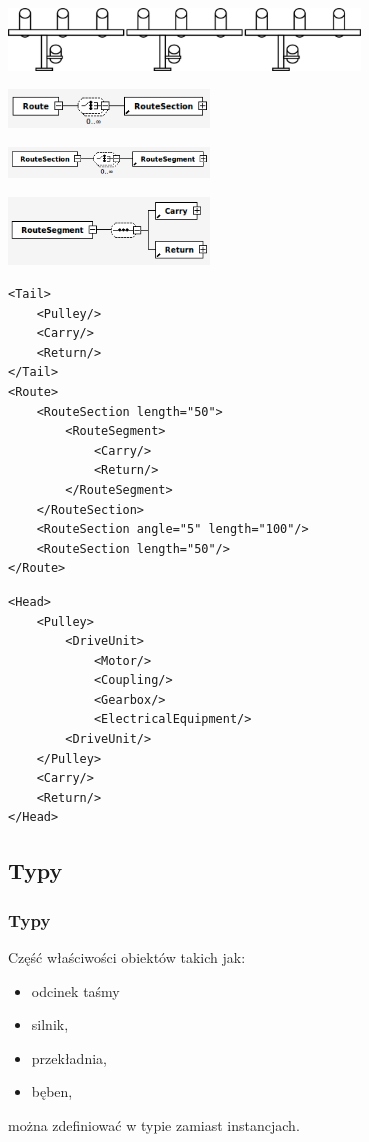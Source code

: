 \documentclass{beamer}
\begin{document}
\begin{frame}
\begin{center}
\includegraphics[width=0.7\textwidth]{png/odcinek_trasy}

\pause

\includegraphics[width=0.4\textwidth]{png/trasa_xsd}

\pause

\includegraphics[width=0.4\textwidth]{png/odcinek_trasy_xsd}

\pause

\includegraphics[width=0.4\textwidth]{png/segment_trasy_xsd}
\end{center}
\end{frame}

\begin{frame}[fragile]
\begin{verbatim}
<Tail>
    <Pulley/>
    <Carry/>
    <Return/>
</Tail>
<Route>
    <RouteSection length="50">
        <RouteSegment>
            <Carry/>
            <Return/>
        </RouteSegment>
    </RouteSection>
    <RouteSection angle="5" length="100"/>
    <RouteSection length="50"/>
</Route>
\end{verbatim}
\end{frame}

\begin{frame}[fragile]
\begin{verbatim}
<Head>
    <Pulley>
        <DriveUnit>
            <Motor/>
            <Coupling/>
            <Gearbox/>
            <ElectricalEquipment/>
        <DriveUnit/>
    </Pulley>
    <Carry/>
    <Return/>
</Head>
\end{verbatim}
\end{frame}

\subsection{Typy}
\begin{frame}
\frametitle{Typy}
Część właściwości obiektów takich jak:
\begin{itemize}
\item odcinek taśmy
\item silnik,
\item przekładnia,
\item bęben,
\end{itemize}
można zdefiniować w typie zamiast instancjach.
\end{frame}
\end{document}

